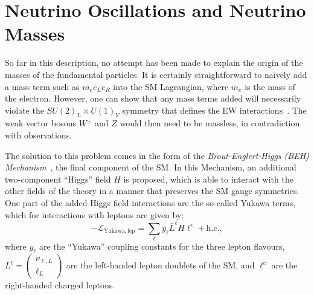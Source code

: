 \section{Neutrino Oscillations and Neutrino Masses}
So far in this description, no attempt has been made to explain the origin of the masses of the fundamental particles. It is certainly straightforward to na\"{i}vely add a mass term such as $m_{e}\bar{e}_{L}e_{R}$ into the SM Lagrangian, where $m_e$ is the mass of the electron. However, one can show that any mass terms added will necessarily violate the $SU(2)_{L}\times U(1)_{Y}$ symmetry that defines the EW interactions~\cite{deppischChapterNeutrinosStandard2019}. %
The weak vector bosons $W^{\pm}$ and $Z$ would then need to be massless, in contradiction with observations.

The solution to this problem comes in the form of the \textit{Brout-Englert-Higgs (BEH) Mechanism}~\cite{englertBrokenSymmetryMass1964,higgsBrokenSymmetriesMasses1964,guralnikGlobalConservationLaws1964}, %
the final component of the SM.  In this Mechanism, an additional two-component ``Higgs'' field $H$ is proposed, which is able to interact with the other fields of the theory in a manner that preserves the SM gauge symmetries. One part of the added Higgs field interactions are the so-called Yukawa terms, which for interactions with leptons are given by:
\begin{equation}\label{eq:SM_yukawa_leptons}
    -\mathcal{L}_{\mathrm{Yukawa,lep}} = \sum_{\ell}y_{\ell}\bar{L}^{\ell}H\ell^{c} + \mathrm{h.c.},
\end{equation}
where $y_{\ell}$ are the ``Yukawa'' coupling constants for the three lepton flavours, $L^{\ell} = \begin{pmatrix}
    \nu_{\ell,L} \\ \ell_{L}
\end{pmatrix}$ are the left-handed lepton doublets of the SM, and $\ell^{c}$ are the right-handed charged leptons.


